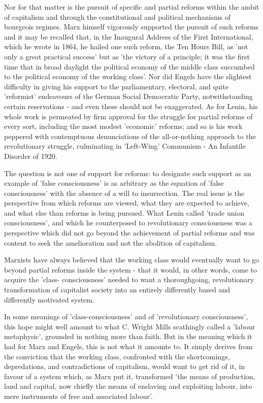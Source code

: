 Nor for that matter is the pursuit of specific and partial reforms within the ambit of capitalism and through the constitutional and political mechanisms of bourgeois regimes. Marx himself vigorously supported the pursuit of such reforms and it may be recalled that, in the Inaugural Address of the First International, which he wrote in 1864, he hailed one such reform, the Ten Hours Bill, as 'not only a great practical success' but as 'the victory of a principle; it was the first time that in broad daylight the political economy of the middle class succumbed to the political economy of the working class'. Nor did Engels have the slightest difficulty in giving his support to the parliamentary, electoral, and quite 'reformist' endeavours of the German Social Democratic Party, notwithstanding certain reservations - and even these should not be exaggerated. As for Lenin, his whole work is permeated by firm approval for the struggle for partial reforms of every sort, including the most modest 'economic' reforms; and so is his work peppered with contemptuous denunciations of the all-or-nothing approach to the revolutionary struggle, culminating in 'Left-Wing' Communism - An Infantile Disorder of 1920.

The question is not one of support for reforms: to designate such support as an example of 'false consciousness' is as arbitrary as the equation of 'false consciousness' with the absence of a will to insurrection. The real issue is the perspective from which reforms are viewed, what they are expected to achieve, and what else than reforms is being pursued. What Lenin called 'trade union consciousness', and which he counterposed to revolutionary consciousness was a perspective which did not go beyond the achievement of partial reforms and was content to seek the amelioration and not the abolition of capitalism.

Marxists have always believed that the working class would eventually want to go beyond partial reforms inside the system - that it would, in other words, come to acquire the 'class- consciousness' needed to want a thoroughgoing, revolutionary transformation of capitalist society into an entirely differently based and differently motivated system.

In some meanings of 'class-consciousness' and of 'revolutionary consciousness', this hope might well amount to what C. Wright Mills scathingly called a 'labour metaphysic', grounded in nothing more than faith. But in the meaning which it had for Marx and Engels, this is not what it amounts to. It simply derives from the conviction that the working class, confronted with the shortcomings, depredations, and contradictions of capitalism, would want to get rid of it, in favour of a system which, as Marx put it, transformed 'the means of production, land and capital, now chiefly the means of enslaving and exploiting labour, into mere instruments of free and associated labour'.

